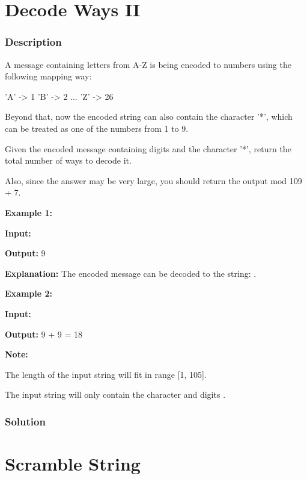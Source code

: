 \newpage

\section{Decode Ways II} %

\subsubsection{Description}
A message containing letters from A-Z is being encoded to numbers using the following mapping way:
\begin{Code}
'A' -> 1
'B' -> 2
...
'Z' -> 26
\end{Code}

Beyond that, now the encoded string can also contain the character '*', which can be treated as one of the numbers from 1 to 9.

Given the encoded message containing digits and the character '*', return the total number of ways to decode it.

Also, since the answer may be very large, you should return the output mod 109 + 7.

\textbf{Example 1:}

\textbf{Input:} 

\textbf{Output:} 9

\textbf{Explanation:} The encoded message can be decoded to the string: .

\textbf{Example 2:}

\textbf{Input:} 

\textbf{Output:} 9 + 9 = 18

\textbf{Note:}

The length of the input string will fit in range [1, 105].

The input string will only contain the character  and digits .
\subsubsection{Solution}

\begin{Code}

\end{Code}

\newpage

\section{Scramble String} %

